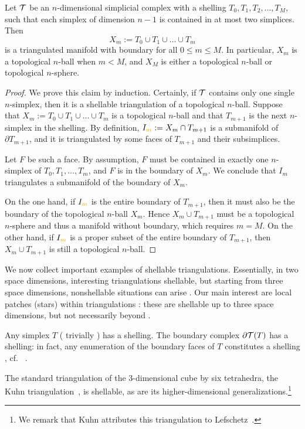 \documentclass[10pt,letterpaper]{article}
\newcommand\cye[1]{%
  \protect\leavevmode
  \begingroup
    \color{red!35!yellow}%
    #1%
  \endgroup
}
\begin{document}
\begin{lemma}\label{lemma:shell_triang_man}
    Let ${\mathcal T}$ be an $n$-dimensional simplicial complex 
    with a shelling $T_{0}, T_{1}, T_{2}, \dots, T_{M}$,
    such that each simplex of dimension $n-1$ is contained in at most two simplices. 
    Then
    $$
        X_{m} := T_{0} \cup T_{1} \cup \dots \cup T_{m}
    $$ 
    is a \cye{triangulated} manifold with boundary for all $0 \leq m \leq M$.
    In particular, $X_{m}$ is a topological $n$-ball when $m < M$, 
    and 
    $X_{M}$ is either a topological $n$-ball or topological $n$-sphere. 
\end{lemma}
\begin{proof}  
    We prove this claim by induction. 
    Certainly, if ${\mathcal T}$ contains only one single $n$-simplex, then it is a shellable triangulation of a topological $n$-ball. 
    Suppose that $X_m := T_{0} \cup T_{1} \cup \dots \cup T_{m}$ is a topological $n$-ball and that $T_{m+1}$ is the next $n$-simplex in the shelling.
    By definition, $I_{\cye{m}} := X_{m} \cap T_{m+1}$ is a submanifold of $\partial T_{m+1}$,
    and it is triangulated by some faces of $T_{m+1}$ and their subsimplices. 
    
    Let $F$ be such a face. 
    By assumption, $F$ must be contained in exactly one $n$-simplex of $T_{0}, T_{1}, \dots, T_{m}$,
    and $F$ is in the boundary of $X_{m}$. We conclude that $I_{m}$ triangulates a submanifold of the boundary of $X_{m}$.
    
    On the one hand, 
    if $I_{\cye{m}}$ is the entire boundary of $T_{m+1}$, 
    then it must also be the boundary of the topological $n$-ball $X_{m}$. 
    Hence $X_{m} \cup T_{m+1}$ must be a topological $n$-sphere and thus a manifold without boundary, which requires $m = M$.
    On the other hand, 
    if $I_{\cye{m}}$ is a proper subset of the entire boundary of $T_{m+1}$, 
    then $X_{m} \cup T_{m+1}$ is still a topological $n$-ball.
\end{proof}


We \cye{now} collect important examples of shellable triangulations. \cye{Essentially, in two space dimensions, interesting triangulations shellable, but starting from three space dimensions, nonshellable situations can arise}. Our main interest are local \cye{patches} (stars) within triangulations\cye{: these are shellable up to three space dimensions, but not necessarily beyond}. 

\begin{example}\label{example:shell_simpl}
    Any simplex $T$ \cye{(}trivially\cye{)} has a shelling. The boundary complex $\partial {\mathcal T}(T)$ has a shelling:
    in fact, any enumeration of the boundary faces of $T$ constitutes a shelling\cye{, cf.~\cite[Example 8.2.(iii)]{ziegler1995lectures}}.
\end{example}
\begin{example}
    The standard triangulation of the $3$-dimensional cube by six tetrahedra, the Kuhn triangulation~\cite{kuhn1960some}, is shellable, as are its higher-dimensional generalizations.\footnote{We remark that Kuhn attributes this triangulation to Lefschetz~\cite{lefschetz2015introduction}.}
\end{example}
\end{document}
